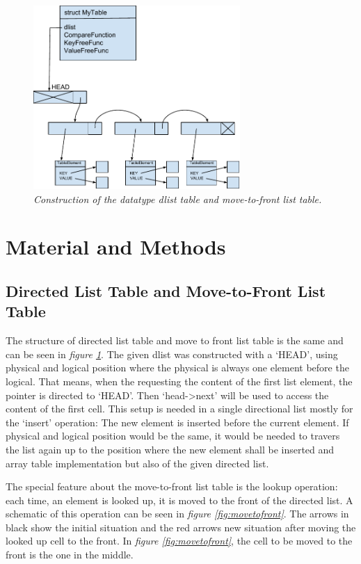 \documentclass[a4paper,11pt,twoside]{article}
\begin{document}
\begin{figure}[H]
\centering
\includegraphics[width=0.7\textwidth]{figures/dlisttable.pdf}
\caption{\textit{Construction of the datatype dlist table and
    move-to-front list table.}}
\label{fig:dlisttable}
\end{figure}


\section{Material and Methods} 
\subsection{Directed List Table and Move-to-Front List Table}
The structure of directed list table and move to front list table is
the same and can be seen in \textit{figure \ref{fig:dlisttable}}. The given
dlist was constructed with a `HEAD', using physical and logical
position where the physical is always one element before the logical. 
That means, when the requesting the content of the first
list element, the pointer is directed to `HEAD'. Then `head->next'
will be used to access the content of the first cell. This setup is
needed in a single directional list mostly for the `insert' operation:
The new element is inserted before the current element. If physical
and logical position would be the same, it would be needed to travers
the list again up to the position where the new element shall be inserted
and array table implementation but also of the given directed list.

The special feature about the move-to-front list table is the lookup
operation: each time, an element is looked up, it is moved to the
front of the directed list. A schematic of this operation can be seen
in \textit{figure \ref{fig:movetofront}}. The arrows in black show the
initial situation and the red arrows new situation after moving the
looked up cell to the front. In \textit{figure \ref{fig:movetofront}},
the cell to be moved to the front is the one in the middle. 
\end{document}
